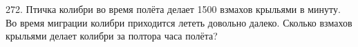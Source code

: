 272. Птичка колибри во время полёта делает 1500 взмахов крыльями в минуту. Во время миграции колибри приходится лететь довольно далеко. Сколько взмахов крыльями делает колибри за полтора часа полёта?\\
